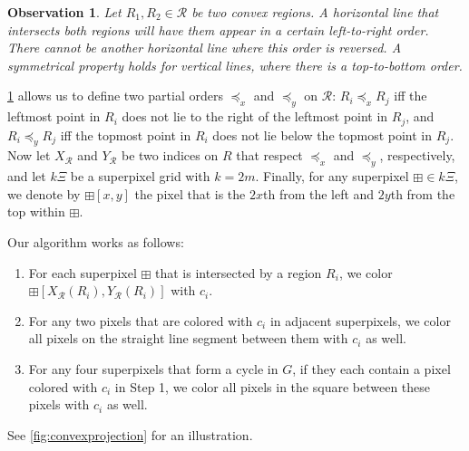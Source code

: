 \documentclass[a4paper,UKenglish,cleveref]{lipics-v2019}
\newtheorem{observation}{Observation}
\newcommand{\spix}{\boxplus}
\begin{document}
\begin{observation}\label{obs:convex-ordering}
Let \(R_1,R_2 \in \mathcal{R}\) be two convex regions. A horizontal line that intersects both regions will have them appear in a certain left-to-right order. There cannot be another horizontal line where this order is reversed. A symmetrical property holds for vertical lines, where there is a top-to-bottom order.
\end{observation}

\cref{obs:convex-ordering} allows us to define two partial orders \(\preceq_x\) and \(\preceq_y\) on \(\mathcal{R}\): \(R_i \preceq_x R_j\) iff the leftmost point in \(R_i\) does not lie to the right of the leftmost point in \(R_j\), and \(R_i \preceq_y R_j\) iff the topmost point in \(R_i\) does not lie below the topmost point in \(R_j\). Now let \(X_\mathcal{R}\) and \(Y_\mathcal{R}\) be two indices on \(R\) that respect \(\preceq_x\) and \(\preceq_y\), respectively, and let \(k\Xi\) be a superpixel grid with \(k = 2m\). Finally, for any superpixel \(\spix \in k\Xi\), we denote by \(\spix[x, y]\) the pixel that is the \(2x\)th from the left and \(2y\)th from the top within \(\spix\).

Our algorithm works as follows:

\begin{enumerate}
	\item For each superpixel \(\spix\) that is intersected by a region \(R_i\), we color \(\spix[X_\mathcal{R}(R_i), Y_\mathcal{R}(R_i)]\) with \(c_i\).
	\item For any two pixels that are colored with \(c_i\) in adjacent superpixels, we color all pixels on the straight line segment between them with \(c_i\) as well.
	\item For any four superpixels that form a cycle in \(G\), if they each contain a pixel colored with \(c_i\) in Step 1, we color all pixels in the square between these pixels with \(c_i\) as well.
\end{enumerate}

\noindent
See \cref{fig:convexprojection} for an illustration.
\end{document}
